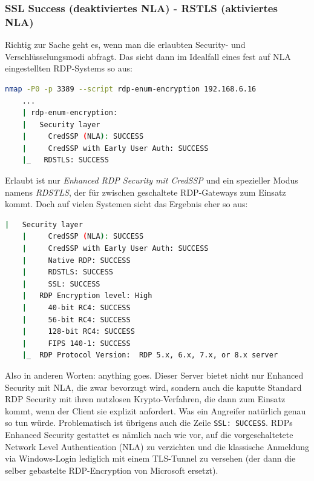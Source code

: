 \subsubsection{SSL Success (deaktiviertes NLA) - RSTLS (aktiviertes NLA)}
Richtig zur Sache geht es, wenn man die erlaubten Security- und Verschlüsselungsmodi abfragt. Das sieht dann im Idealfall eines fest auf NLA eingestellten RDP-Systems so aus:
\begin{lstlisting}[language=bash]
    nmap -P0 -p 3389 --script rdp-enum-encryption 192.168.6.16
    ...
    | rdp-enum-encryption:
    |   Security layer
    |     CredSSP (NLA): SUCCESS
    |     CredSSP with Early User Auth: SUCCESS
    |_   RDSTLS: SUCCESS
\end{lstlisting}
Erlaubt ist nur \textit{Enhanced RDP Security mit CredSSP} und ein spezieller Modus namens \textit{RDSTLS}, der für zwischen geschaltete RDP-Gateways zum Einsatz kommt. Doch auf vielen Systemen sieht das Ergebnis eher so aus:
\begin{lstlisting}[language=bash]
    |   Security layer
    |     CredSSP (NLA): SUCCESS
    |     CredSSP with Early User Auth: SUCCESS
    |     Native RDP: SUCCESS
    |     RDSTLS: SUCCESS
    |     SSL: SUCCESS
    |   RDP Encryption level: High
    |     40-bit RC4: SUCCESS
    |     56-bit RC4: SUCCESS
    |     128-bit RC4: SUCCESS
    |     FIPS 140-1: SUCCESS
    |_  RDP Protocol Version:  RDP 5.x, 6.x, 7.x, or 8.x server
\end{lstlisting}
Also in anderen Worten: \glqq anything goes\grqq. Dieser Server bietet nicht nur Enhanced Security mit NLA, die zwar bevorzugt wird, sondern auch die kaputte Standard RDP Security mit ihren nutzlosen Krypto-Verfahren, die dann zum Einsatz kommt, wenn der Client sie explizit anfordert. Was ein Angreifer natürlich genau so tun würde.
Problematisch ist übrigens auch die Zeile \lstinline|SSL: SUCCESS|. RDPs Enhanced Security gestattet es nämlich nach wie vor, auf die vorgeschaltetete Network Level Authentication (NLA) zu verzichten und die klassische Anmeldung via Windows-Login lediglich mit einem TLS-Tunnel zu versehen (der dann die selber gebastelte RDP-Encryption von Microsoft ersetzt).
